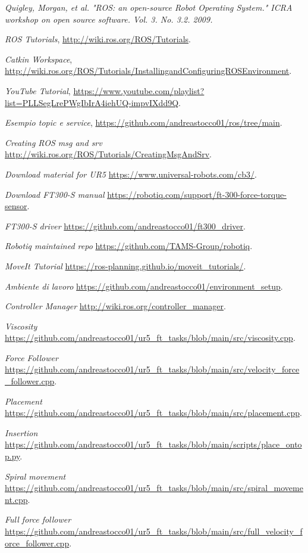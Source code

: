 \begin{thebibliography}{99}

 \textit{Quigley, Morgan, et al. "ROS: an open-source Robot Operating System." ICRA workshop on open source software. 
Vol. 3. No. 3.2. 2009.}

 \textit{ROS Tutorials}, \url{http://wiki.ros.org/ROS/Tutorials}.

 \textit{Catkin Workspace}, \url{http://wiki.ros.org/ROS/Tutorials/InstallingandConfiguringROSEnvironment}.

 \textit{YouTube Tutorial}, \url{https://www.youtube.com/playlist?list=PLLSegLrePWgIbIrA4iehUQ-impvIXdd9Q}.

 \textit{Esempio topic e service}, \url{https://github.com/andreastocco01/ros/tree/main}.

 \textit{Creating ROS msg and srv} \url{http://wiki.ros.org/ROS/Tutorials/CreatingMsgAndSrv}.

 \textit{Download material for UR5} \url{https://www.universal-robots.com/cb3/}.

 \textit{Download FT300-S manual} \url{https://robotiq.com/support/ft-300-force-torque-sensor}.

 \textit{FT300-S driver} \url{https://github.com/andreastocco01/ft300_driver}.

 \textit{Robotiq maintained repo} \url{https://github.com/TAMS-Group/robotiq}.

 \textit{MoveIt Tutorial} \url{https://ros-planning.github.io/moveit_tutorials/}.

 \textit{Ambiente di lavoro} \url{https://github.com/andreastocco01/environment_setup}.

 \textit{Controller Manager} \url{http://wiki.ros.org/controller_manager}.

 \textit{Viscosity} \url{https://github.com/andreastocco01/ur5_ft_tasks/blob/main/src/viscosity.cpp}. 

 \textit{Force Follower} \url{https://github.com/andreastocco01/ur5_ft_tasks/blob/main/src/velocity_force_follower.cpp}.

 \textit{Placement} \url{https://github.com/andreastocco01/ur5_ft_tasks/blob/main/src/placement.cpp}.

 \textit{Insertion} \url{https://github.com/andreastocco01/ur5_ft_tasks/blob/main/scripts/place_ontop.py}.

 \textit{Spiral movement} \url{https://github.com/andreastocco01/ur5_ft_tasks/blob/main/src/spiral_movement.cpp}. 

 \textit{Full force follower} \url{https://github.com/andreastocco01/ur5_ft_tasks/blob/main/src/full_velocity_force_follower.cpp}.

\end{thebibliography}